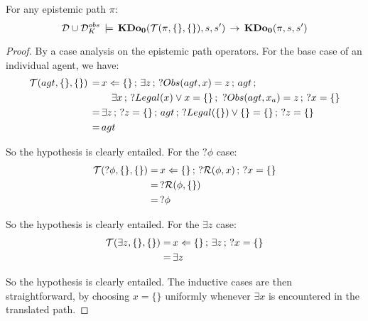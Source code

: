 \medskip{}


\begin{lemma}
\label{lem:KDoZ_E1_impl_KDoZ}For any epistemic path $\pi$:\[
\mathcal{D}\cup\mathcal{D}_{K}^{obs}\,\models\,\mathbf{KDo_{0}}(\mathcal{T}(\pi,\{\},\{\}),s,s')\,\rightarrow\,\mathbf{KDo_{0}}(\pi,s,s')\]

\end{lemma}
\begin{proof}
By a case analysis on the epistemic path operators. For the base case
of an individual agent, we have:\begin{align*}
\mathcal{T}(agt,\{\},\{\})\,=\, & x\Leftarrow\{\}\,;\,\exists z\,;\,?Obs(agt,x)=z\,;\, agt\,;\\
 & \,\,\,\,\,\,\exists x\,;\,?Legal(x)\vee x=\{\}\,;\,\,?Obs(agt,x_{a})=z\,;\,?x=\{\}\\
=\, & \exists z\,;\,?z=\{\}\,;\, agt\,;\,?Legal(\{\})\vee\{\}=\{\}\,;\,?z=\{\}\\
=\, & agt\end{align*}


So the hypothesis is clearly entailed. For the $?\phi$ case:\begin{align*}
\mathcal{T}(?\phi,\{\},\{\})=\, & x\Leftarrow\{\}\,;\,?\mathcal{R}(\phi,x)\,;\,?x=\{\}\\
=\, & ?\mathcal{R}(\phi,\{\})\\
=\, & ?\phi\end{align*}


So the hypothesis is clearly entailed. For the $\exists z$ case:\begin{align*}
\mathcal{T}(\exists z,\{\},\{\})=\, & x\Leftarrow\{\}\,;\,\exists z\,;\,?x=\{\}\\
=\, & \exists z\end{align*}


So the hypothesis is clearly entailed. The inductive cases are then
straightforward, by choosing $x=\{\}$ uniformly whenever $\exists x$
is encountered in the translated path. 
\end{proof}
\bigskip{}


